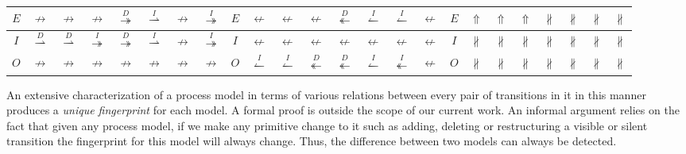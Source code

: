 \documentclass{llncs}
\begin{document}
\begin{table}[htbp]
\begin{tabular}{|c|c|c|c|c|c|c|c!{\vrule width 1.5pt}c|c|c|c|c|c|c|c!{\vrule width 1.5pt}c|c|c|c|c|c|c|c|}
	$E$ & $\nrightarrow$ & $\nrightarrow$ & $\nrightarrow$ & $\overset{D}{\twoheadrightarrow}$ & $\overset{I}{\rightharpoonup}$ & $\nrightarrow$ & $\overset{I}{\twoheadrightarrow}$ &
	$E$ & $\nleftarrow$ & $\nleftarrow$ & $\nleftarrow$ & $\overset{D}{\twoheadleftarrow}$ & $\overset{I}{\leftharpoonup}$ & $\overset{I}{\leftharpoonup}$ & $\nleftarrow$ &
	$E$ & $\Uparrow$ & $\Uparrow$ & $\Uparrow$ & $\nparallel$ & $\nparallel$ & $\nparallel$ & $\nparallel$\\ \hline

	$I$ & $\overset{D}{\rightharpoonup}$ & $\overset{D}{\rightharpoonup}$ & $\overset{I}{\twoheadrightarrow}$ & $\overset{D}{\twoheadrightarrow}$ & $\overset{I}{\rightharpoonup}$ & $\nrightarrow$ & $\overset{I}{\twoheadrightarrow}$ &
	$I$ & $\nleftarrow$ & $\nleftarrow$ & $\nleftarrow$ & $\nleftarrow$ & $\nleftarrow$ & $\nleftarrow$ & $\nleftarrow$ &
	$I$ & $\nparallel$ & $\nparallel$ & $\nparallel$ & $\nparallel$ & $\nparallel$ & $\nparallel$ & $\nparallel$\\ \hline

	$O$ & $\nrightarrow$ & $\nrightarrow$ & $\nrightarrow$ & $\nrightarrow$ & $\nrightarrow$ & $\nrightarrow$ & $\nrightarrow$ &
	$O$ & $\overset{I}{\leftharpoonup}$ & $\overset{I}{\leftharpoonup}$ & $\overset{D}{\twoheadleftarrow}$ & $\overset{D}{\twoheadleftarrow}$ & $\overset{I}{\leftharpoonup}$ & $\overset{I}{\twoheadleftarrow}$ & $\nleftarrow$ &
	$O$ & $\nparallel$ & $\nparallel$ & $\nparallel$ & $\nparallel$ & $\nparallel$ & $\nparallel$ & $\nparallel$\\ \hline
\end{tabular}
\end{table}

An extensive characterization of a process model in terms of various relations between every pair of transitions in it in this manner produces a \textit{unique fingerprint} for each model. A formal proof is outside the scope of our current work. An informal argument relies on the fact that given any process model, if we make any primitive change to it such as adding, deleting or restructuring a visible or silent transition the fingerprint for this model will always change. Thus, the difference between two models can always be detected.

\end{document}
